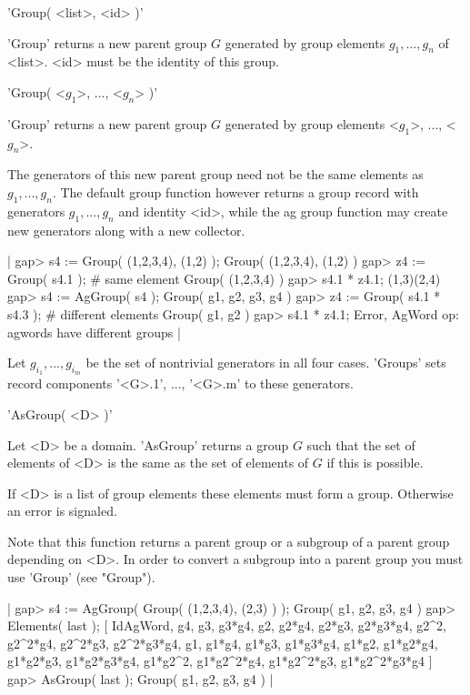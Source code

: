 'Group( <list>, <id> )'

'Group' returns a new parent group  $G$ generated by group elements $g_1,
..., g_n$ of <list>. <id> must be the identity of this group.

'Group( <$g_1$>, ..., <$g_n$> )'

'Group'  returns  a   new parent group   $G$ generated  by group elements
<$g_1$>, ..., <$g_n$>.

The generators of this new parent group need not  be the same elements as
$g_1, ...,  g_n$.  The default group  function  however returns   a group
record with generators  $g_1, ..., g_n$  and identity <id>,  while the ag
group function may create new generators along with a new  collector.

|    gap> s4 := Group( (1,2,3,4), (1,2) );
    Group( (1,2,3,4), (1,2) )
    gap> z4 := Group( s4.1 ); # same element
    Group( (1,2,3,4) )
    gap> s4.1 * z4.1;
    (1,3)(2,4)
    gap> s4 := AgGroup( s4 );
    Group( g1, g2, g3, g4 )
    gap> z4 := Group( s4.1 * s4.3 ); # different elements
    Group( g1, g2 )
    gap> s4.1 * z4.1;
    Error, AgWord op: agwords have different groups |

Let $g_{i_1}, ...,  g_{i_m}$ be the  set of nontrivial  generators in all
four cases.   'Groups' sets  record components  '<G>.1',  ..., '<G>.m' to
these generators.


'AsGroup( <D> )'

Let <D> be a domain. 'AsGroup' returns a group $G$ such that  the  set of
elements of  <D> is the same as  the set of  elements of $G$  if  this is
possible.

If <D> is  a list of  group elements these  elements must  form  a group.
Otherwise an error is signaled.

Note that this function returns a parent group or a subgroup  of a parent
group  depending on <D>. In order  to convert a   subgroup  into a parent
group you must use 'Group' (see "Group").

|    gap> s4 := AgGroup( Group( (1,2,3,4), (2,3) ) );
    Group( g1, g2, g3, g4 )
    gap> Elements( last );
    [ IdAgWord, g4, g3, g3*g4, g2, g2*g4, g2*g3, g2*g3*g4, g2^2, g2^2*g4,
      g2^2*g3, g2^2*g3*g4, g1, g1*g4, g1*g3, g1*g3*g4, g1*g2, g1*g2*g4, 
      g1*g2*g3, g1*g2*g3*g4, g1*g2^2, g1*g2^2*g4, g1*g2^2*g3, 
      g1*g2^2*g3*g4 ]
    gap> AsGroup( last );
    Group( g1, g2, g3, g4 ) |

